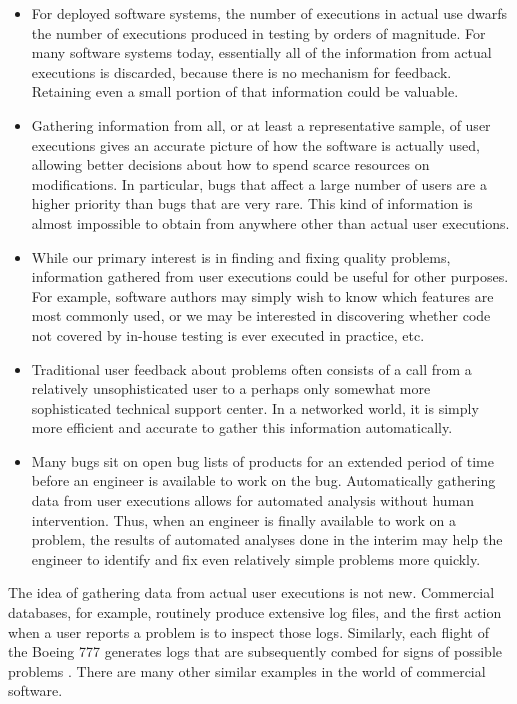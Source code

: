 \begin{itemize}
  
\item For deployed software systems, the number of executions in
  actual use dwarfs the number of executions produced in testing by
  orders of magnitude.  For many software systems today, essentially
  all of the information from actual executions is discarded, because
  there is no mechanism for feedback.  Retaining even a small portion
  of that information could be valuable.
  
\item Gathering information from all, or at least a representative
  sample, of user executions gives an accurate picture of how the
  software is actually used, allowing better decisions about how to
  spend scarce resources on modifications. In particular, bugs that
  affect a large number of users are a higher priority than bugs that
  are very rare.  This kind of information is almost impossible to
  obtain from anywhere other than actual user executions.
  
\item While our primary interest is in finding and fixing quality
  problems, information gathered from user executions could be useful
  for other purposes.  For example, software authors may simply wish
  to know which features are most commonly used, or we may be
  interested in discovering whether code not covered by in-house
  testing is ever executed in practice, etc.
  
\item Traditional user feedback about problems often consists of a
  call from a relatively unsophisticated user to a perhaps only
  somewhat more sophisticated technical support center.  In a
  networked world, it is simply more efficient and accurate to gather
  this information automatically.
  
\item Many bugs sit on open bug lists of products for an extended
  period of time before an engineer is available to work on the bug.
  Automatically gathering data from user executions allows for
  automated analysis without human intervention.  Thus, when an
  engineer is finally available to work on a problem, the results of
  automated analyses done in the interim may help the engineer to
  identify and fix even relatively simple problems more quickly.
\end{itemize}

The idea of gathering data from actual user executions is not new.
Commercial databases, for example, routinely produce extensive log
files, and the first action when a user reports a problem is to
inspect those logs.  Similarly, each flight of the Boeing 777
generates logs that are subsequently combed for signs of possible
problems \cite{Esler:2001:WVR}.  There are many other similar examples
in the world of commercial software.

